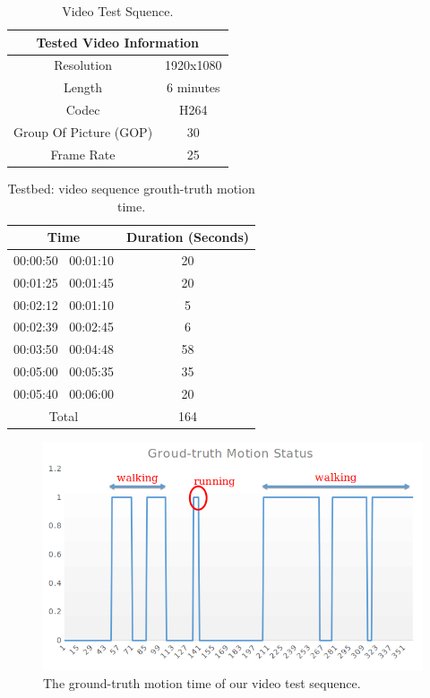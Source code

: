 \begin{table}[]
\centering
\caption{Video Test Squence.}
\label{tab:videotest}
\begin{tabular}{|c|c|}
\hline
\multicolumn{2}{|c|}{\textbf{Tested Video Information}} \\ \hline
Resolution                        & 1920x1080           \\ \hline
Length                            & 6 minutes           \\ \hline
Codec                             & H264                \\ \hline
Group Of Picture (GOP)            & 30                  \\ \hline
Frame Rate                        & 25                  \\ \hline
\end{tabular}
\end{table}
\begin{table}[]
\centering
\caption{Testbed: video sequence grouth-truth motion time.}
\label{tab:motiontime}
\begin{tabular}{|c|c|}
\hline
\textbf{Time}       & \textbf{Duration (Seconds)} \\ \hline
00:00:50 $~$ 00:01:10 & 20                          \\ \hline
00:01:25 $~$ 00:01:45 & 20                          \\ \hline
00:02:12 $~$ 00:01:10 & 5                           \\ \hline
00:02:39 $~$ 00:02:45 & 6                           \\ \hline
00:03:50 $~$ 00:04:48 & 58                          \\ \hline
00:05:00 $~$ 00:05:35 & 35                          \\ \hline
00:05:40 $~$ 00:06:00 & 20                          \\ \hline
Total               & 164                         \\ \hline
\end{tabular}
\end{table}
\begin{figure}
\centering
 \includegraphics[scale=0.4]{Figures/ground-truth.png}
 \caption{The ground-truth motion time of our video test sequence.}
 \label{fig:ground}
\end{figure}
